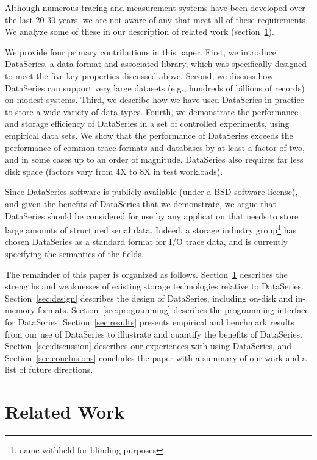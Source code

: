 \documentclass{acm_proc_article-sp}
\begin{document}
Although numerous tracing and measurement systems have been developed
over the last 20-30 years, we are not aware of any that meet all of
these requirements. We analyze some of these in our description of
related work (section~\ref{sec:related}).

We provide four primary contributions in this paper.  First, we
introduce DataSeries, a data format and associated library, which was
specifically designed to meet the five key properties discussed above.
Second, we discuss how DataSeries can support very large datasets
(e.g., hundreds of billions of records) on modest systems.  Third, we
describe how we have used DataSeries in practice to store a wide
variety of data types.  Fourth, we demonstrate the performance and
storage efficiency of DataSeries in a set of controlled experiments,
using empirical data sets. We show that the performance of DataSeries
exceeds the performance of common trace formats and databases by at
least a factor of two, and in some cases up to an order of
magnitude. DataSeries also requires far less disk space (factors vary
from 4X to 8X in test workloads).

Since DataSeries software is publicly available (under a BSD software
license), and given the benefits of DataSeries that we demonstrate, we
argue that DataSeries should be considered for use by any application
that needs to store large amounts of structured serial data. Indeed, a
storage industry group\footnote{name withheld for blinding purposes}
has chosen DataSeries as a standard format for I/O trace data, and is
currently specifying the semantics of the fields.

The remainder of this paper is organized as follows.
Section~\ref{sec:related} describes the strengths and weaknesses of
existing storage technologies relative to DataSeries.
Section~\ref{sec:design} describes the design of DataSeries, including
on-disk and in-memory formats.  Section~\ref{sec:programming}
describes the programming interface for DataSeries.
Section~\ref{sec:results} presents empirical and benchmark results
from our use of DataSeries to illustrate and quantify the benefits of
DataSeries.  Section~\ref{sec:discussion} describes our experiences
with using DataSeries, and Section~\ref{sec:conclusions} concludes the
paper with a summary of our work and a list of future directions.

\section{Related Work}\label{sec:related}
\end{document}
